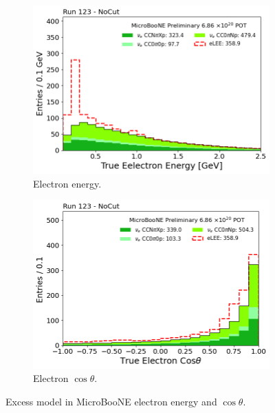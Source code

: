 \begin{figure}[H]
    \centering
    \begin{subfigure}{0.49\linewidth}
        \includegraphics[width=\linewidth]{technote/SignalModel/Figures/uB_ShwKE_LEE.png}
        \caption{Electron energy.}
    \end{subfigure}
    \begin{subfigure}{0.49\linewidth}
        \includegraphics[width=\linewidth]{technote/SignalModel/Figures/uB_ShwTheta_LEE.png}
        \caption{Electron $\cos\theta$.}
    \end{subfigure}
    \caption{Excess model in MicroBooNE electron energy and $\cos\theta$.}
    \label{fig:uB_excess}
\end{figure}